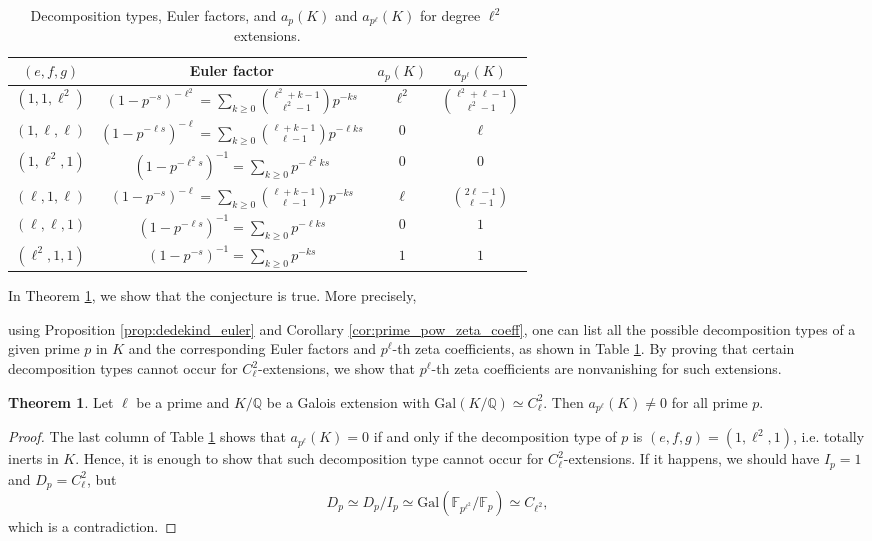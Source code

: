\documentclass[letterpaper, 10pt]{article}
\newcommand{\Gal}{\mathrm{Gal}}
\newcommand{\bQ}{\mathbb{Q}}
\newcommand{\1}{\mathds{1}}	%
\theoremstyle{definition}
\newtheorem{theorem}{Theorem}[section]
\theoremstyle{remark}
\begin{document}
\begin{table}[h]
    \begin{center}
        \begin{tabular}{c|c|c|c}
            \toprule
            $(e, f, g)$ & Euler factor & $a_{p}(K)$ & $a_{p^\ell}(K)$ \\
            \midrule
            $(1, 1, \ell^2)$ & $(1 - p^{-s})^{-\ell^2} = \sum_{k \ge 0} \binom{\ell^2 + k - 1}{\ell^2 - 1}p^{-ks}$ & $\ell^2$ & $\binom{\ell^2 + \ell - 1}{\ell^2 - 1}$ \\
            $(1, \ell, \ell)$ & $(1 - p^{-\ell s})^{-\ell} = \sum_{k \ge 0} \binom{\ell + k - 1}{\ell - 1} p^{-\ell k s}$ & $0$ & $\ell$ \\
            $(1, \ell^2, 1)$ & $(1 - p^{-\ell^2 s})^{-1} = \sum_{k \ge 0}p^{-\ell^2 k s}$ & $0$ & $0$ \\
            $(\ell, 1, \ell)$ & $(1 - p^{-s})^{-\ell} = \sum_{k \ge 0} \binom{\ell + k - 1}{\ell - 1} p^{-ks}$ & $\ell$ & $\binom{2\ell - 1}{\ell - 1}$ \\
            $(\ell, \ell, 1)$ & $(1 - p^{-\ell s})^{-1} = \sum_{k \ge 0} p^{-\ell k s}$ & $0$ & $1$ \\
            $(\ell^2, 1, 1)$ & $(1 - p^{-s})^{-1} = \sum_{k \ge 0} p^{-ks}$ & $1$ & $1$ \\
            \bottomrule
        \end{tabular}
        \caption{Decomposition types, Euler factors, and $a_p(K)$ and $a_{p^{\ell}}(K)$ for degree $\ell^2$ extensions.}
        \label{tab:lsqeuler}
    \end{center}
\end{table}



In Theorem \ref{thm:ClClextn}, we show that the conjecture is true. More precisely,

using Proposition \ref{prop:dedekind_euler} and Corollary \ref{cor:prime_pow_zeta_coeff}, one can list all the possible decomposition types of a given prime $p$ in $K$ and the corresponding Euler factors and $p^\ell$-th zeta coefficients, as shown in Table \ref{tab:lsqeuler}.
By proving that certain decomposition types cannot occur for $C_\ell^2$-extensions, we show that $p^\ell$-th zeta coefficients are nonvanishing for such extensions.

\begin{theorem}
    \label{thm:ClClextn}
    Let $\ell$ be a prime and $K / \bQ$ be a Galois extension with $\Gal(K / \bQ) \simeq C_\ell^2$.
    Then $a_{p^\ell}(K) \ne 0$ for all prime $p$.
\end{theorem}
\begin{proof}
     The last column of Table \ref{tab:lsqeuler} shows that $a_{p^\ell}(K) = 0$ if and only if the decomposition type of $p$ is $(e, f, g) = (1, \ell^2, 1)$, i.e. totally inerts in $K$. Hence, it is enough to show that such decomposition type cannot occur for $C_{\ell}^2$-extensions.
    If it happens, we should have $I_p = 1$ and $D_p = C_\ell^2$, but  \[ D_p \simeq D_p / I_p \simeq \Gal(\mathbb{F}_{p^{\ell^2}} / \mathbb{F}_p) \simeq C_{\ell^2},\] which is a contradiction.
\end{proof}
\end{document}
